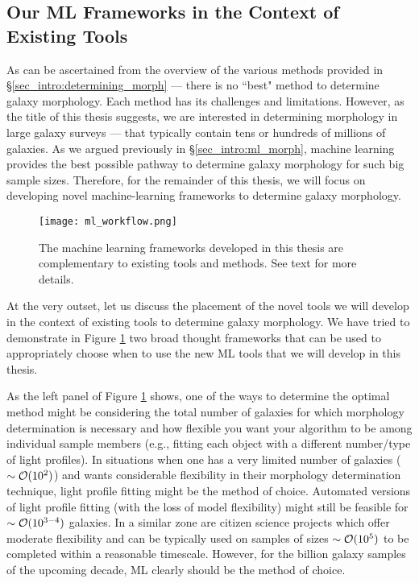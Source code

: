 \subsection{Our ML Frameworks in the Context of Existing Tools} \label{sec_intro:ml_complementary}
As can be ascertained from the overview of the various methods provided in \S \ref{sec_intro:determining_morph} --- there is no ``best" method to determine galaxy morphology. Each method has its challenges and limitations. However, as the title of this thesis suggests, we are interested in determining morphology in large galaxy surveys --- that typically contain tens or hundreds of millions of galaxies. As we argued previously in \S \ref{sec_intro:ml_morph}, machine learning provides the best possible pathway to determine galaxy morphology for such big sample sizes. Therefore, for the remainder of this thesis, we will focus on developing novel machine-learning frameworks to determine galaxy morphology. 

\begin{figure}[htbp]
    \centering
    \texttt{[image: ml\_workflow.png]}
    \caption{The machine learning frameworks developed in this thesis are complementary to existing tools and methods. See text for more details.}
    \label{fig_intro:ml_workflow}
\end{figure}

At the very outset, let us discuss the placement of the novel tools we will develop in the context of existing tools to determine galaxy morphology. We have tried to demonstrate in Figure \ref{fig_intro:ml_workflow} two broad thought frameworks that can be used to appropriately choose when to use the new ML tools that we will develop in this thesis.

As the left panel of Figure \ref{fig_intro:ml_workflow} shows, one of the ways to determine the optimal method might be considering the total number of galaxies for which morphology determination is necessary and how flexible you want your algorithm to be among individual sample members (e.g., fitting each object with a different number/type of light profiles). In situations when one has a very limited number of galaxies ($\sim \mathcal{O}(10^{2})$) and wants considerable flexibility in their morphology determination technique, light profile fitting might be the method of choice. Automated versions of light profile fitting (with the loss of model flexibility) might still be feasible for $\sim \mathcal{O}(10^{3-4})$ galaxies. In a similar zone are citizen science projects which offer moderate flexibility and can be typically used on samples of sizes $\sim \mathcal{O}(10^{5})$ to be completed within a reasonable timescale. However, for the billion galaxy samples of the upcoming decade, ML clearly should be the method of choice. 

